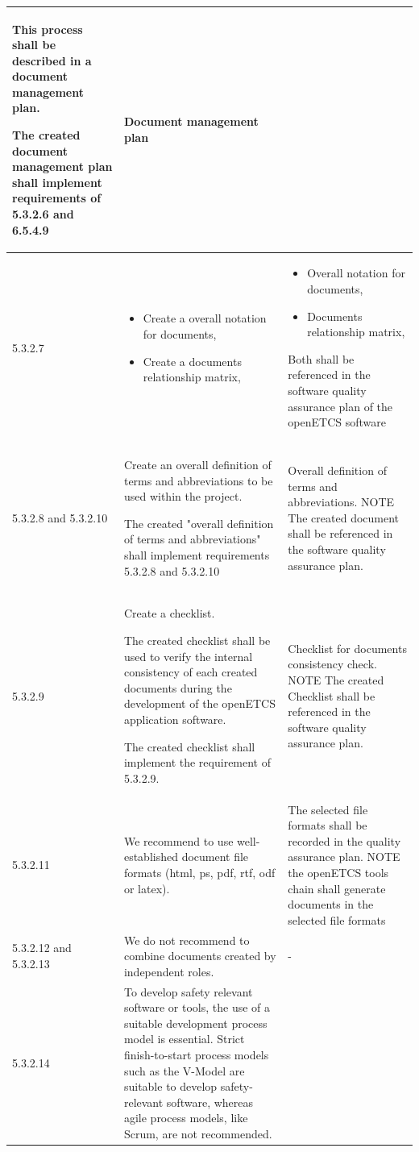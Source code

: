 \documentclass{template/openetcs_report}
\begin{document}
{\begin{longtable}{|p{2cm}|p{9cm}|p{3cm}|}
This process shall be described in a document management plan.

The created document management plan shall implement requirements of 5.3.2.6 and 6.5.4.9
& Document management plan\\ 
\hline
5.3.2.7 & 
\begin{itemize}\itemsep=0pt
  \item Create a overall notation for documents,
  \item Create a documents relationship matrix,
\end{itemize} 
& 
\begin{itemize}\itemsep=0pt
  \item Overall notation for documents,
  \item Documents relationship matrix,
\end{itemize} 

Both shall be referenced in the software quality assurance plan of the openETCS software\\ 
\hline
5.3.2.8 and 5.3.2.10 & Create an overall definition of terms and abbreviations to be used within the project. 

The created "overall definition of terms and abbreviations" shall implement requirements 5.3.2.8 and 5.3.2.10
& Overall definition of terms and abbreviations.
\linebreak
\linebreak
NOTE\linebreak
The created document shall be referenced in the software quality assurance plan.\\ 
\hline
5.3.2.9 & Create a checklist. 

The created checklist shall be used to verify the internal consistency of each created documents during the development of the openETCS application software.

The created checklist shall implement the requirement of 5.3.2.9.
& Checklist for documents consistency check.
\linebreak
\linebreak
NOTE\linebreak
The created Checklist shall be referenced in the software quality assurance plan.\\ 
\hline
5.3.2.11 & We recommend to use well-established document file formats (html, ps, pdf, rtf, odf or latex).
& The selected file formats shall be recorded in the quality assurance plan.
\linebreak
\linebreak
NOTE\linebreak
the openETCS tools chain shall generate documents in the selected file formats\\ 
\hline
5.3.2.12 and 5.3.2.13 & We do not recommend to combine documents created by independent roles. 
& - \\ 
\hline
5.3.2.14 & To develop safety relevant software or tools, the use of a suitable development process model is essential. Strict finish-to-start process models such as the V-Model are suitable to develop safety-relevant software, whereas agile process models, like Scrum, are not recommended. 


\end{longtable}}
\end{document}
